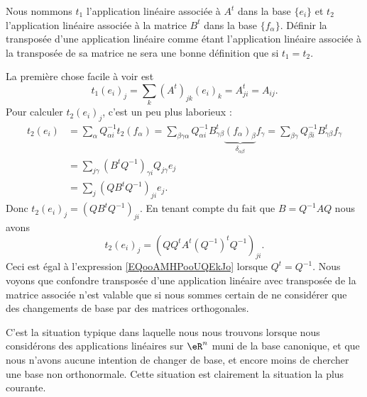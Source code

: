 Nous nommons \( t_1\) l'application linéaire associée à \( A^t\) dans la base \( \{ e_i \}\) et \( t_2\) l'application linéaire associée à la matrice \( B^t\) dans la base \( \{ f_{\alpha} \}\). Définir la transposée d'une application linéaire comme étant l'application linéaire associée à la transposée de sa matrice ne sera une bonne définition que si \( t_1=t_2\).

La première chose facile à voir est
\begin{equation}        \label{EQooAMHPooUQEkJo}
	t_1(e_i)_j=\sum_k(A^t)_{jk}(e_i)_k=A^t_{ji}=A_{ij}.
\end{equation}
Pour calculer \( t_2(e_i)_j\), c'est un peu plus laborieux :
\begin{subequations}
	\begin{align}
		t_2(e_i) & =\sum_{\alpha}Q_{\alpha i}^{-1} t_2(f_\alpha)=\sum_{\beta\gamma\alpha}Q_{\alpha i}^{-1}B^t_{\gamma\beta}\underbrace{(f_{\alpha})_{\beta}}_{\delta_{\alpha\beta}}f_{\gamma}=\sum_{\beta\gamma}Q_{\beta i}^{-1}B^t_{\gamma\beta}f_{\gamma} \\
		         & =\sum_{j\gamma}(B^tQ^{-1})_{\gamma i}Q_{j\gamma}e_j                                                                                                                                                                                      \\
		         & =\sum_j(QB^tQ^{-1})_{ji}e_j.
	\end{align}
\end{subequations}
Donc \( t_2(e_i)_j=(QB^tQ^{-1})_{ji}\). En tenant compte du fait que \( B=Q^{-1}AQ\) nous avons
\begin{equation}
	t_2(e_i)_j=(QQ^tA^t(Q^{-1})^tQ^{-1})_{ji}.
\end{equation}
Ceci est égal à l'expression \eqref{EQooAMHPooUQEkJo} lorsque \( Q^t=Q^{-1}\). Nous voyons que confondre transposée d'une application linéaire avec transposée de la matrice associée n'est valable que si nous sommes certain de ne considérer que des changements de base par des matrices orthogonales.

C'est la situation typique dans laquelle nous nous trouvons lorsque nous considérons des applications linéaires sur \( \eR^n\) muni de la base canonique, et que nous n'avons aucune intention de changer de base, et encore moins de chercher une base non orthonormale. Cette situation est clairement la situation la plus courante.

